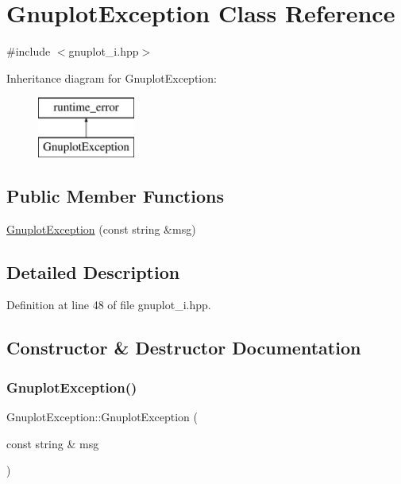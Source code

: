 \hypertarget{class_gnuplot_exception}{}\section{Gnuplot\+Exception Class Reference}
\label{class_gnuplot_exception}


{\ttfamily \#include $<$gnuplot\+\_\+i.\+hpp$>$}

Inheritance diagram for Gnuplot\+Exception\+:\begin{figure}[H]
\begin{center}
\leavevmode
\includegraphics[height=2.000000cm]{class_gnuplot_exception}
\end{center}
\end{figure}
\subsection*{Public Member Functions}
\begin{DoxyCompactItemize}
\item 
\mbox{\hyperlink{class_gnuplot_exception_a81fc74a5c019556a4d0ba2a042a63448}{Gnuplot\+Exception}} (const string \&msg)
\end{DoxyCompactItemize}


\subsection{Detailed Description}


Definition at line 48 of file gnuplot\+\_\+i.\+hpp.



\subsection{Constructor \& Destructor Documentation}
\mbox{\label{class_gnuplot_exception_a81fc74a5c019556a4d0ba2a042a63448}} 
\subsubsection{\texorpdfstring{Gnuplot\+Exception()}{GnuplotException()}}
{\footnotesize\ttfamily Gnuplot\+Exception\+::\+Gnuplot\+Exception (\begin{DoxyParamCaption}\item[{const string \&}]{msg }\end{DoxyParamCaption})\hspace{0.3cm}{\ttfamily [inline]}}



